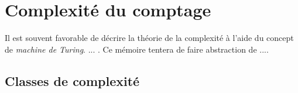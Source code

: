 \chapter{Complexité du comptage}
\label{cha:complexite-du-comptage}

Il est souvent favorable de décrire la théorie de la complexité à l'aide du concept de \textit{machine de Turing}. ... . Ce mémoire tentera de faire abstraction de ....



\section{Classes de complexité}

